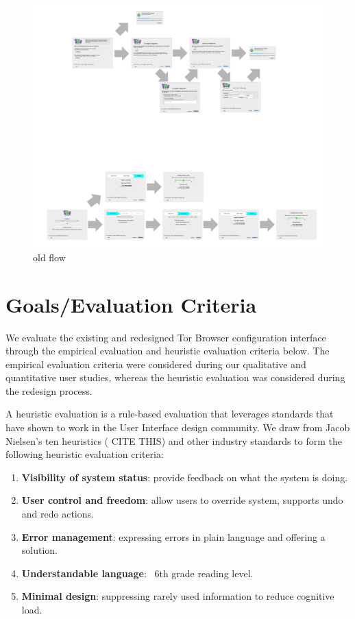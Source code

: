 \documentclass[USenglish,oneside,twocolumn]{article}
\begin{document}
\begin{figure}[t]
	\label{fig:old-flow}
	\centering
		\includegraphics[width=1.0\textwidth]{old-flow.pdf} 
		\caption{old flow} 
\end{figure} 

\section{Goals/Evaluation Criteria}
\label{sec:goals}
We evaluate the existing and redesigned Tor Browser configuration interface 
through the empirical evaluation and heuristic evaluation criteria below. The
empirical evaluation criteria were considered during our qualitative and 
quantitative user studies, whereas the heuristic evaluation was considered during
the redesign process. 

A heuristic evaluation is a rule-based evaluation that leverages standards
that have shown to work in the User Interface design 
community. We draw from Jacob Nielsen's ten heuristics ({\color {red} CITE THIS})
and other industry standards to form the following heuristic evaluation criteria: \\

\begin{enumerate}
    \item  {\bfseries Visibility of system status}: provide feedback on what the system is doing.
    \item  {\bfseries User control and freedom}: allow users to override system, supports undo and redo actions. 
    \item  {\bfseries Error management}: expressing errors in plain language and offering a solution. 
    \item  {\bfseries Understandable language}: ~6th grade reading level. 
    \item  {\bfseries Minimal design}: suppressing rarely used information to reduce cognitive load. 
\end{enumerate}
\end{document}
